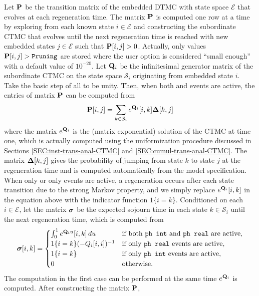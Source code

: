 \begin{developer}
Let $\P$ be the transition matrix of the embedded DTMC with state space $\mathcal{E}$
that evolves at each regeneration time.
The matrix $\P$ is computed one row at a time by exploring from each known state $i\in\mathcal{E}$
and constructing the subordinate CTMC that evolves until the next regeneration time is reached
with new embedded states $j\in\mathcal{E}$ such that $\P[i, j]>0$.
Actually, only values $\P[i, j] > \Code{Pruning}$ are stored where the
user option  is
considered ``small enough'' with a default value of $10^{-20}$.
Let $\Q_i$ be the infinitesimal generator matrix of the subordinate CTMC on the state space
$\mathcal{S}_i$ originating from embedded state $i$.  Take the basic step of all 
to be unity.  Then, when both  and  events are active,
the entries of matrix $\P$ can be computed from
\[
  \P[i, j] = \sum_{k\in\mathcal{S}_i} e^{\Q_i}[i, k] \matr{\Delta}[k, j]
\]
where the matrix $e^{\Q_i}$ is the (matrix exponential) solution of the CTMC at time one,
which is actually computed using the uniformization
procedure discussed in Sections \ref{SEC:inst-trans-anal-CTMC} and \ref{SEC:cumul-trans-anal-CTMC}.
The matrix $\matr{\Delta}[k, j]$ gives the probability of jumping from state $k$ to state $j$
at the regeneration time and is computed automatically from the model specification.
When only  or only  events are active,
a regeneration occurs after each state transition due to the strong Markov property, and we
simply replace $e^{\Q_i}[i, k]$ in the equation above with the indicator function $1\{i=k\}$.
Conditioned on each $i\in\mathcal{E}$, let the matrix $\gvect{\sigma}$ be the expected sojourn time
in each state $k\in\mathcal{S}_i$ until the next regeneration time, which is computed from
\[
  \gvect{\sigma}[i, k] =
  \begin{cases}
    \int_{0}^{1} e^{\Q_i u}[i, k]\,du
                               & \mbox{if both \Code{ph int} and \Code{ph real} are active}, \\
    1\{i=k\} (-Q_i[i, i])^{-1} & \mbox{if only \Code{ph real} events are active}, \\
    1\{i=k\}                   & \mbox{if only \Code{ph int} events are active},  \\
    0                          & \mbox{otherwise}.
  \end{cases}
\]
The computation in the first case can be performed at the same time $e^{\Q_i}$ is computed.
After constructing the matrix $\P$,

\end{developer}

